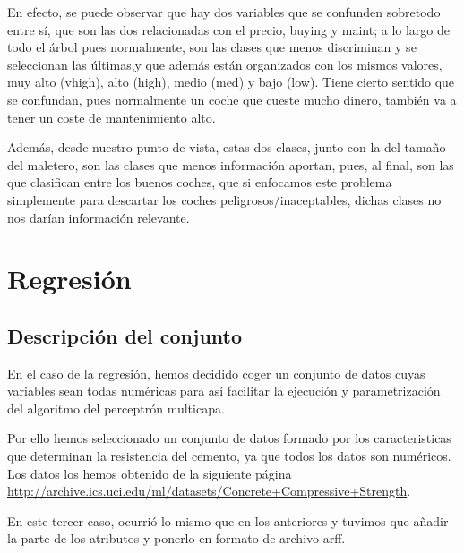 \documentclass[a4paper, 11pt, twoside, openany, onecolumn, final]{memoir}
\begin{document}
	En efecto, se puede observar que hay dos variables que se confunden sobretodo entre sí, que son las dos relacionadas con el precio, buying y maint; a lo largo de todo el árbol pues normalmente, son las clases que menos discriminan y se seleccionan las últimas,y que además están organizados con los mismos valores, muy alto (vhigh), alto (high), medio (med) y bajo (low). Tiene cierto sentido que se confundan, pues normalmente un coche que cueste mucho dinero, también va a tener un coste de mantenimiento alto. 
	
	Además, desde nuestro punto de vista, estas dos clases, junto con la del tamaño del maletero, son las clases que menos información aportan, pues, al final, son las que clasifican entre los buenos coches, que si enfocamos este problema simplemente para descartar los coches peligrosos/inaceptables, dichas clases no nos darían información relevante.
	
\chapter{Regresión}
	\section{Descripción del conjunto}
	En el caso de la regresión, hemos decidido coger un conjunto de datos cuyas variables sean todas numéricas para así facilitar la ejecución y parametrización del algoritmo del perceptrón multicapa. 
	
	Por ello hemos seleccionado un conjunto de datos formado por los caracteristicas que determinan la resistencia del cemento, ya que todos los datos son numéricos.
	Los datos los hemos obtenido de la siguiente página \url{http://archive.ics.uci.edu/ml/datasets/Concrete+Compressive+Strength}.
	
	En este tercer caso, ocurrió lo mismo que en los anteriores y tuvimos que añadir la parte de los atributos y ponerlo en formato de archivo arff.
	
\end{document}
